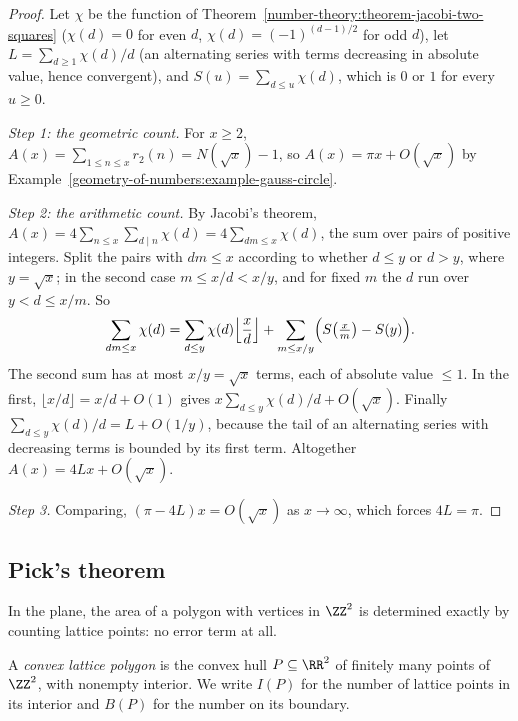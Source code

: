 \begin{proof}
Let $\chi$ be the function of Theorem~\ref{number-theory:theorem-jacobi-two-squares} ($\chi(d) = 0$ for even $d$, $\chi(d) = (-1)^{(d-1)/2}$ for odd $d$), let $L = \sum_{d \geq 1}\chi(d)/d$ (an alternating series
with terms decreasing in absolute value, hence convergent), and $S(u) = \sum_{d \leq u}\chi(d)$, which is $0$ or $1$ for every $u \geq 0$.

\emph{Step 1: the geometric count.} For $x \geq 2$, $A(x) = \sum_{1 \leq n \leq x}r_2(n) = N(\sqrt x) - 1$, so $A(x) = \pi x + O(\sqrt x)$ by Example~\ref{geometry-of-numbers:example-gauss-circle}.

\emph{Step 2: the arithmetic count.} By Jacobi's theorem, $A(x) = 4\sum_{n \leq x}\sum_{d \mid n}\chi(d) = 4\sum_{dm \leq x}\chi(d)$, the sum over pairs of positive integers. Split the pairs with
$dm \leq x$ according to whether $d \leq y$ or $d > y$, where $y = \sqrt x$; in the second case $m \leq x/d < x/y$, and for fixed $m$ the $d$ run over $y < d \leq x/m$. So
\[
\sum_{dm \leq x}\chi(d) = \sum_{d \leq y}\chi(d)\Bigl\lfloor\frac xd\Bigr\rfloor + \sum_{m \leq x/y}\Bigl(S\bigl(\tfrac xm\bigr) - S(y)\Bigr).
\]
The second sum has at most $x/y = \sqrt x$ terms, each of absolute value $\leq 1$. In the first, $\lfloor x/d \rfloor = x/d + O(1)$ gives $x\sum_{d \leq y}\chi(d)/d + O(\sqrt x)$. Finally
$\sum_{d \leq y}\chi(d)/d = L + O(1/y)$, because the tail of an alternating series with decreasing terms is bounded by its first term. Altogether $A(x) = 4Lx + O(\sqrt x)$.

\emph{Step 3.} Comparing, $(\pi - 4L)x = O(\sqrt x)$ as $x \to \infty$, which forces $4L = \pi$.
\end{proof}

\subsection{Pick's theorem}\label{geometry-of-numbers:subsection-pick}

In the plane, the area of a polygon with vertices in $\ZZ^2$ is determined exactly by counting lattice points: no error term at all.

\begin{definition}\label{geometry-of-numbers:definition-lattice-polygon}
A \emph{convex lattice polygon} is the convex hull $P \subseteq \RR^2$ of finitely many points of $\ZZ^2$, with nonempty interior. We write $I(P)$ for the number of lattice points in its interior
and $B(P)$ for the number on its boundary.
\end{definition}

